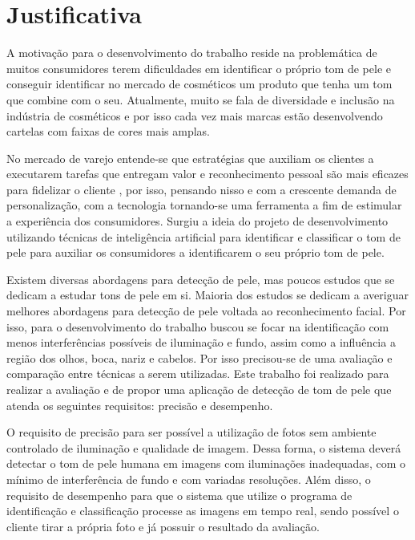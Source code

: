\section{Justificativa}
\label{justificativa}

A motivação para o desenvolvimento do trabalho reside na problemática de muitos consumidores terem dificuldades em identificar o próprio tom de pele e conseguir identificar no mercado de cosméticos um produto que tenha um tom que combine com o seu. Atualmente, muito se fala de diversidade e inclusão na indústria de cosméticos e por isso cada vez mais marcas estão desenvolvendo cartelas com faixas de cores mais amplas.

No mercado de varejo entende-se que estratégias que auxiliam os clientes a executarem tarefas que entregam valor e reconhecimento pessoal são mais eficazes para fidelizar o cliente \cite{Snap_and_match_a_case_study_of_virtual_color_cosmetics_consultation}, por isso, pensando nisso e com a crescente demanda de personalização, com a tecnologia tornando-se uma ferramenta a fim de estimular a experiência dos consumidores. Surgiu a ideia do projeto de desenvolvimento utilizando técnicas de inteligência artificial para identificar e classificar o tom de pele para auxiliar os consumidores a identificarem o seu próprio tom de pele. 

Existem diversas abordagens para detecção de pele, mas poucos estudos que se dedicam a estudar tons de pele em si. Maioria dos estudos se dedicam a averiguar melhores abordagens para detecção de pele voltada ao reconhecimento facial. Por isso, para o desenvolvimento do trabalho buscou se focar na identificação com menos interferências possíveis de iluminação e fundo, assim como a influência a região dos olhos, boca, nariz e cabelos. Por isso precisou-se de uma avaliação e comparação entre técnicas a serem utilizadas. Este trabalho foi realizado para realizar a avaliação e de propor uma aplicação de detecção de tom de pele que atenda os seguintes requisitos: precisão e desempenho.

O requisito de precisão para ser possível a utilização de fotos sem ambiente controlado de iluminação e qualidade de imagem. Dessa forma, o sistema deverá detectar o tom de pele humana em imagens com iluminações inadequadas, com o mínimo de interferência de fundo e com variadas resoluções. Além disso, o requisito de desempenho para que o sistema que utilize o programa de identificação e classificação processe as imagens em tempo real, sendo possível o cliente tirar a própria foto e já possuir o resultado da avaliação.

